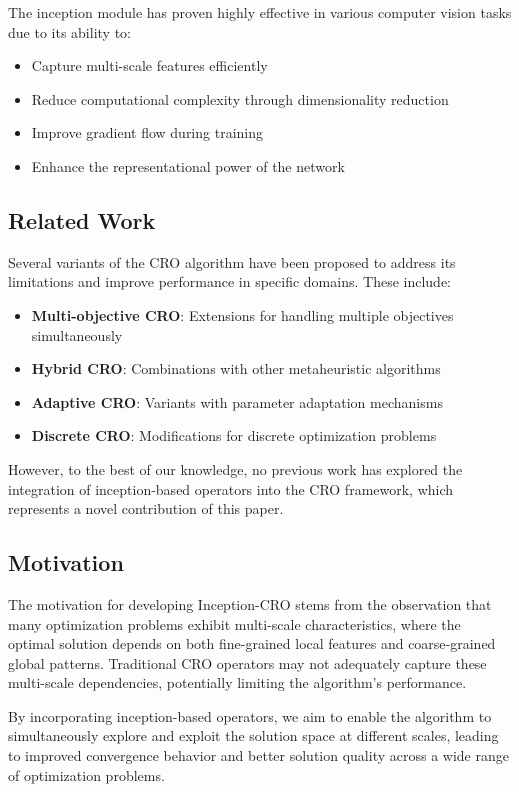 The inception module has proven highly effective in various computer vision tasks due to its ability to:
\begin{itemize}
    \item Capture multi-scale features efficiently
    \item Reduce computational complexity through dimensionality reduction
    \item Improve gradient flow during training
    \item Enhance the representational power of the network
\end{itemize}

\subsection{Related Work}

Several variants of the CRO algorithm have been proposed to address its limitations and improve performance in specific domains. These include:

\begin{itemize}
    \item \textbf{Multi-objective CRO}: Extensions for handling multiple objectives simultaneously
    \item \textbf{Hybrid CRO}: Combinations with other metaheuristic algorithms
    \item \textbf{Adaptive CRO}: Variants with parameter adaptation mechanisms
    \item \textbf{Discrete CRO}: Modifications for discrete optimization problems
\end{itemize}

However, to the best of our knowledge, no previous work has explored the integration of inception-based operators into the CRO framework, which represents a novel contribution of this paper.

\subsection{Motivation}

The motivation for developing Inception-CRO stems from the observation that many optimization problems exhibit multi-scale characteristics, where the optimal solution depends on both fine-grained local features and coarse-grained global patterns. Traditional CRO operators may not adequately capture these multi-scale dependencies, potentially limiting the algorithm's performance.

By incorporating inception-based operators, we aim to enable the algorithm to simultaneously explore and exploit the solution space at different scales, leading to improved convergence behavior and better solution quality across a wide range of optimization problems.
